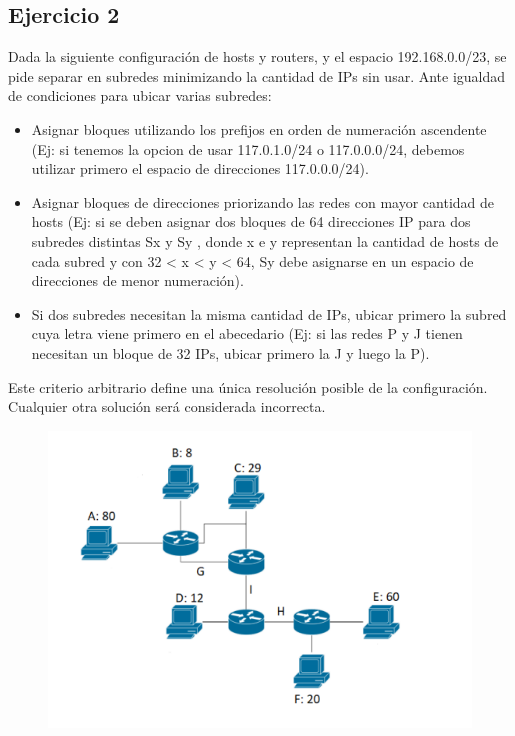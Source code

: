 \subsection{Ejercicio 2}

Dada la siguiente configuración de hosts y routers, y el espacio 192.168.0.0/23, se pide separar en subredes minimizando la cantidad de IPs sin usar. Ante igualdad de condiciones para ubicar varias subredes:
\begin{itemize}
    \item Asignar bloques utilizando los prefijos en orden de numeración ascendente (Ej: si tenemos la opcion de usar 117.0.1.0/24 o 117.0.0.0/24, debemos utilizar primero el espacio de direcciones 117.0.0.0/24).
    \item  Asignar bloques de direcciones priorizando las redes con mayor cantidad de hosts (Ej: si se deben asignar dos bloques de 64 direcciones IP para dos subredes distintas Sx y Sy , donde x e y representan la cantidad de hosts de cada subred y con 32 < x < y < 64, Sy debe asignarse en un espacio de direcciones de menor numeración).
    \item Si dos subredes necesitan la misma cantidad de IPs, ubicar primero la subred cuya letra viene primero en el abecedario (Ej: si las redes P y J tienen necesitan un bloque de 32 IPs, ubicar primero la J y luego la P).
\end{itemize}
Este criterio arbitrario define una única resolución posible de la configuración. Cualquier otra solución será considerada incorrecta.

\begin{figure}[H]
\centering
\includegraphics[width=\textwidth]{imagenes/subnetting2.png}
\end{figure}
